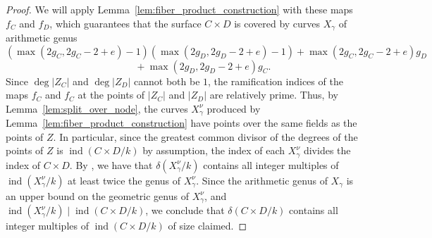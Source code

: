 \documentclass[a4paper,11pt]{amsart}
\theoremstyle{plain}
\theoremstyle{remark}
\newcommand{\dendegs}{\delta}
\newcommand{\ind}{\operatorname{ind}}
\begin{document}
\begin{proof}
    We will apply Lemma~\ref{lem:fiber_product_construction} with these maps \(f_C\) and \(f_D\), which guarantees that the surface \(C \times D\) is covered by curves \(X_\gamma\) of arithmetic genus
    \[(\max(2g_C, 2g_C-2+e) - 1)( \max(2g_D, 2g_D-2+e) -1) + \max(2g_C, 2g_C-2+e)g_D \]
    \[\qquad \qquad+ \max(2g_D, 2g_D-2+e)g_C.\]
    Since \(\deg |Z_C|\) and \(\deg |Z_D|\) cannot both be \(1\), the ramification indices of the maps \(f_C\) and \(f_C\) at the points of \(|Z_C|\) and \(|Z_D|\) are relatively prime.
   Thus, by Lemma~\ref{lem:split_over_node}, the curves \(X_\gamma^\nu\) produced by Lemma~\ref{lem:fiber_product_construction} have points over the same fields as the points of \(Z\).  In particular, since the greatest common divisor of the degrees of the points of \(Z\) is \(\ind(C \times D/k)\) by assumption, the index of each \(X_\gamma^\nu\) divides the index of \(C \times D\).  
    By \cite[Proposition 5.1.1]{VV}, we have that \(\dendegs(X_\gamma^\nu/k)\) contains all integer multiples of \(\ind(X_\gamma^\nu/k)\) at least twice the genus of \(X_\gamma^\nu\).  Since the arithmetic genus of \(X_\gamma\) is an upper bound on the geometric genus of \(X_\gamma^\nu\), and \(\ind(X_\gamma^\nu/k) \mid \ind(C \times D/k)\), we conclude that \(\dendegs(C \times D/k)\) contains all integer multiples of \(\ind(C \times D/k)\) of size claimed. 
\end{proof}
\end{document}
